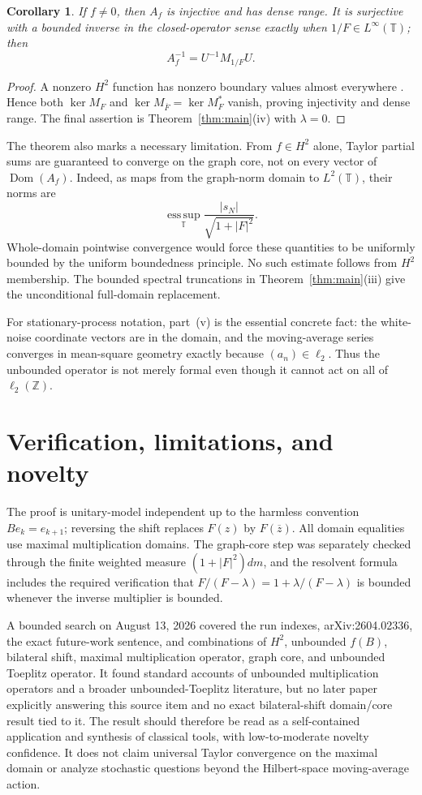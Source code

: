 \documentclass[11pt]{article}
\newtheorem{corollary}{Corollary}
\theoremstyle{remark}
\newcommand{\T}{\mathbb{T}}
\newcommand{\Z}{\mathbb{Z}}
\newcommand{\Dom}{\operatorname{Dom}}
\begin{document}
\begin{corollary}\label{cor:invert}
If \(f\ne0\), then \(A_f\) is injective and has dense range.  It is
surjective with a bounded inverse in the closed-operator sense exactly when
\(1/F\in L^\infty(\T)\); then
\[
 A_f^{-1}=U^{-1}M_{1/F}U.
\]
\end{corollary}

\begin{proof}
A nonzero \(H^2\) function has nonzero boundary values almost everywhere
\cite{Duren}.  Hence both \(\ker M_F\) and
\(\ker M_{\overline F}=\ker M_F^*\) vanish, proving injectivity and dense
range.  The final assertion is Theorem~\ref{thm:main}(iv) with
\(\lambda=0\).
\end{proof}

The theorem also marks a necessary limitation.  From \(f\in H^2\) alone,
Taylor partial sums are guaranteed to converge on the graph core, not on
every vector of \(\Dom(A_f)\).  Indeed, as maps from the graph-norm domain
to \(L^2(\T)\), their norms are
\[
 \operatorname*{ess\,sup}_{\T}
 \frac{|s_N|}{\sqrt{1+|F|^2}}.
\]
Whole-domain pointwise convergence would force these quantities to be
uniformly bounded by the uniform boundedness principle.  No such estimate
follows from \(H^2\) membership.  The bounded spectral truncations in
Theorem~\ref{thm:main}(iii) give the unconditional full-domain replacement.

For stationary-process notation, part~(v) is the essential concrete fact:
the white-noise coordinate vectors are in the domain, and the moving-average
series converges in mean-square geometry exactly because
\((a_n)\in\ell_2\).  Thus the unbounded operator is not merely formal even
though it cannot act on all of \(\ell_2(\Z)\).

\section{Verification, limitations, and novelty}

The proof is unitary-model independent up to the harmless convention
\(Be_k=e_{k+1}\); reversing the shift replaces \(F(z)\) by \(F(\overline z)\).
All domain equalities use maximal multiplication domains.  The graph-core
step was separately checked through the finite weighted measure
\((1+|F|^2)dm\), and the resolvent formula includes the required verification
that \(F/(F-\lambda)=1+\lambda/(F-\lambda)\) is bounded whenever the inverse
multiplier is bounded.

A bounded search on August 13, 2026 covered the run indexes, arXiv:2604.02336,
the exact future-work sentence, and combinations of \(H^2\), unbounded
\(f(B)\), bilateral shift, maximal multiplication operator, graph core, and
unbounded Toeplitz operator.  It found standard accounts of unbounded
multiplication operators and a broader unbounded-Toeplitz literature, but no
later paper explicitly answering this source item and no exact
bilateral-shift domain/core result tied to it.  The result should therefore
be read as a self-contained application and synthesis of classical tools,
with low-to-moderate novelty confidence.  It does not claim universal
Taylor convergence on the maximal domain or analyze stochastic questions
beyond the Hilbert-space moving-average action.
\end{document}
